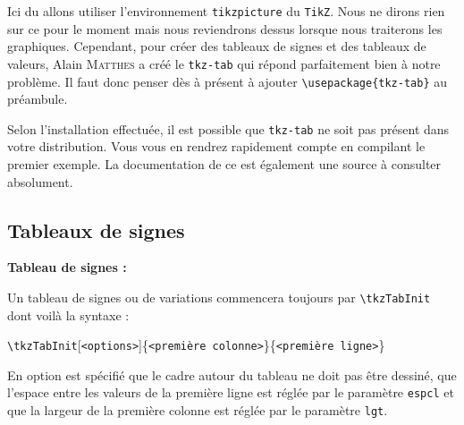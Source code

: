 Ici du allons utiliser l'environnement \texttt{tikzpicture} du  \texttt{TikZ}. Nous ne dirons rien sur ce  pour le moment mais nous reviendrons dessus lorsque nous traiterons les graphiques. Cependant, pour créer des tableaux de signes et des tableaux de valeurs, Alain \textsc{Matthes} a créé le  \texttt{tkz-tab} qui répond parfaitement bien à notre problème. Il faut donc penser dès à présent à ajouter \verb!\usepackage{tkz-tab}! au préambule.

\begin{info}
    Selon l'installation effectuée, il est possible que \texttt{tkz-tab} ne soit pas présent dans votre distribution. Vous vous en rendrez rapidement compte en compilant le premier exemple. La documentation de ce  est également une source à consulter absolument.
\end{info}

\subsection{Tableaux de signes}

\begin{CenterExample}
    \textbf{Tableau de signes :}\par
\end{CenterExample}
\bigskip

Un tableau de signes ou de variations commencera toujours par \texttt{\textbackslash tkzTabInit} dont voilà la syntaxe :
\begin{center}
    \texttt{\textbackslash tkzTabInit}[\texttt{<options>}]\{\texttt{<première colonne>}\}\{\texttt{<première ligne>}\}
\end{center}

 En option est spécifié que le cadre autour du tableau ne doit pas être dessiné, que l'espace entre les valeurs de la première ligne est réglée par le paramètre \verb!espcl! et que la largeur de la première colonne est réglée par le paramètre \verb!lgt!.
 
